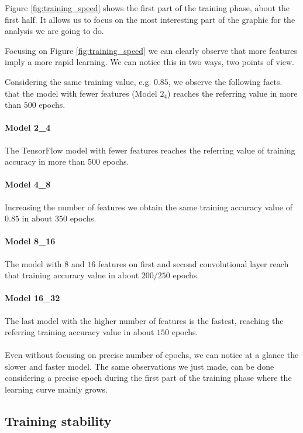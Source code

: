 Figure \ref{fig:training_speed} shows the first part of the training phase, about the first half. It allows us to focus on the most interesting part of the graphic for the analysis we are going to do.

Focusing on Figure \ref{fig:training_speed} we can clearly observe that more features imply a more rapid learning. We can notice this in two ways, two points of view.

Considering the same training value, e.g. $0.85$, we observe the following facts. that the model with fewer features (Model $2_4$) reaches the referring value in more than $500$ epochs.

\paragraph{Model 2\_4}

The TensorFlow model with fewer features reaches the referring value of training accuracy in more than $500$ epochs.

\paragraph{Model 4\_8}

Increasing the number of features we obtain the same training accuracy value of $0.85$ in about $350$ epochs.

\paragraph{Model 8\_16}

The model with $8$ and $16$ features on first and second convolutional layer reach that training accuracy value in about $200/250$ epochs.

\paragraph{Model 16\_32}

The last model with the higher number of features is the fastest, reaching the referring training accuracy value in about $150$ epochs.
\\
\\
Even without focusing on precise number of epochs, we can notice at a glance the slower and faster model. The same observations we just made, can be done considering a precise epoch during the first part of the training phase where the learning curve mainly grows.

\subsection{Training stability}


